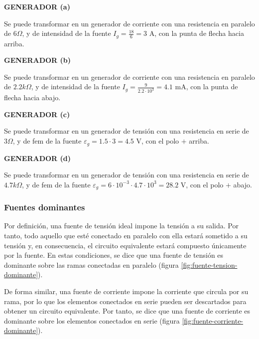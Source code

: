 \begin{example}
          \textbf{GENERADOR (a)}
	    
          Se puede transformar en un generador de corriente con una
          resistencia en paralelo de $6\Omega$, y de intensidad de la
          fuente $I_g=\frac{18}{6}=3$ A, con la punta de flecha hacia
          arriba.
	    
          \textbf{GENERADOR (b)}
	    
          Se puede transformar en un generador de corriente con una
          resistencia en paralelo de $2.2k\Omega$, y de intensidad de
          la fuente $I_g=\frac{9}{2.2\cdot10^3}=4.1$ mA, con la punta
          de flecha hacia abajo.
	    
          \textbf{GENERADOR (c)}
	    
          Se puede transformar en un generador de tensión con una
          resistencia en serie de $3\Omega$, y de fem de la fuente
          $\varepsilon_g=1.5\cdot 3=4.5$ V, con el polo $+$ arriba.
	    
          \textbf{GENERADOR (d)}
	    
          Se puede transformar en un generador de tensión con una
          resistencia en serie de $4.7k\Omega$, y de fem de la fuente
          $\varepsilon_g=6\cdot 10^{-3}\cdot 4.7\cdot 10^3=28.2$ V,
          con el polo $+$ abajo.
	\end{example}
        
        \subsubsection{Fuentes dominantes}
        \label{sec:dominancia}


        Por definición, una fuente de tensión ideal impone la tensión
        a su salida. Por tanto, todo aquello que esté conectado en
        paralelo con ella estará sometido a su tensión y, en
        consecuencia, el circuito equivalente estará compuesto
        únicamente por la fuente. En estas condiciones, se dice que
        una fuente de tensión es dominante sobre las ramas conectadas
        en paralelo (figura \ref{fig:fuente-tension-dominante}).

        De forma similar, una fuente de corriente impone la corriente
        que circula por su rama, por lo que los elementos conectados
        en serie pueden ser descartados para obtener un circuito
        equivalente. Por tanto, se dice que una fuente de corriente es
        dominante sobre los elementos conectados en serie (figura
        \ref{fig:fuente-corriente-dominante}).

